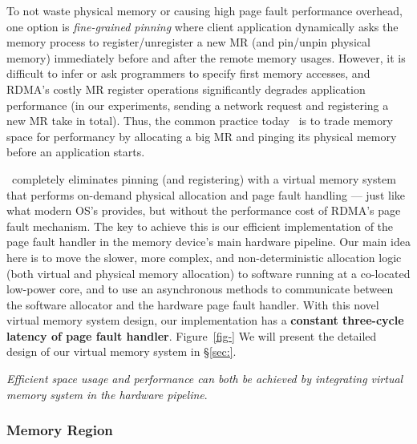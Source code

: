 To not waste physical memory or causing high page fault performance overhead, 
one option is \textit{fine-grained pinning} where client application dynamically asks 
the memory process to register/unregister a new MR (and pin/unpin physical memory)  
immediately before and after the remote memory usages.
However, it is difficult to infer or ask programmers to specify first memory accesses, 
and RDMA's costly MR register operations significantly degrades application performance
(in our experiments, sending a network request and registering a new MR take  in total).
Thus, the common practice today~\cite{FastSwap,XXX} is to trade memory space for performancy by 
allocating a big MR and pinging its physical memory before an application starts.

\sys\ completely eliminates pinning (and registering) with a virtual memory system that 
performs on-demand physical allocation and page fault handling --- just like what modern OS's provides,
but without the performance cost of RDMA's page fault mechanism.
The key to achieve this is our efficient implementation of the page fault handler in the memory device's main hardware pipeline.
Our main idea here is to move the slower, more complex, and non-deterministic allocation logic (both virtual and physical memory allocation)
to software running at a co-located low-power core, and to use an asynchronous methods to communicate 
between the software allocator and the hardware page fault handler.
With this novel virtual memory system design, our implementation has a \textbf{constant three-cycle latency of page fault handler}.
Figure~\ref{fig-} 
We will present the detailed design of our virtual memory system in \S\ref{sec:}.

\textit{Efficient space usage and performance can both be achieved by integrating virtual memory system in the hardware pipeline}.


\subsubsection{Memory Region}
\label{sec:mr}

